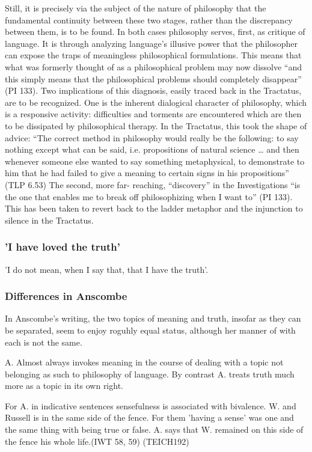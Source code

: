 \documentclass[../main.tex]{subfiles}
\begin{document}
Still, it is precisely via the subject of the nature of philosophy that the fundamental continuity between these two stages, rather than the discrepancy between them, is to be found. In both cases philosophy serves, first, as critique of language. It is through analyzing language's illusive power that the philosopher can expose the traps of meaningless philosophical formulations. This means that what was formerly thought of as a philosophical problem may now dissolve “and this simply means that the philosophical problems should completely disappear” (PI 133). Two implications of this diagnosis, easily traced back in the Tractatus, are to be recognized. One is the inherent dialogical character of philosophy, which is a responsive activity: difficulties and torments are encountered which are then to be dissipated by philosophical therapy. In the Tractatus, this took the shape of advice: “The correct method in philosophy would really be the following: to say nothing except what can be said, i.e. propositions of natural science … and then whenever someone else wanted to say something metaphysical, to demonstrate to him that he had failed to give a meaning to certain signs in his propositions” (TLP 6.53) The second, more far- reaching, “discovery” in the Investigations “is the one that enables me to break off philosophizing when I want to” (PI 133). This has been taken to revert back to the ladder metaphor and the injunction to silence in the Tractatus.

\subsubsection{'I have loved the truth'}

'I do not mean, when I say that, that I have the truth'.

\subsubsection {Differences in Anscombe}
In Anscombe's writing, the two topics of meaning and truth, insofar as they can be separated, seem to enjoy roguhly equal status, although her manner of with each is not the same.

A. Almost always invokes meaning in the course of dealing with a topic not belonging as such to philosophy of language.
By contrast A. treats truth much more as a topic in its own right. 

For A. in indicative sentences sensefulness is associated with bivalence. W. and Russell is in the same side of the fence. For them 'having a sense' was one and the same thing with being true or false. A. says that W. remained on this side of the fence his whole life.(IWT 58, 59) (TEICH192)
\end{document}
